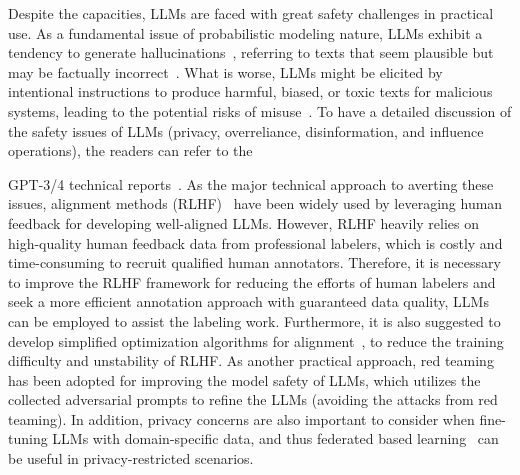 Despite the capacities, LLMs are faced with great safety challenges in practical use.
As a fundamental issue of probabilistic modeling nature, LLMs exhibit a tendency to generate hallucinations~\cite{Bang-arxiv-2023-A}, referring to texts that seem plausible but may be factually incorrect~\cite{OpenAI-OpenAI-2023-GPT-4}.  
What is worse, 
LLMs might be elicited by intentional instructions to produce harmful, biased, or toxic texts for malicious systems, leading to the potential risks of misuse~\cite{Brown-NeurIPS-2020-Language,Ouyang-arxiv-2022-Training}. 
To have a detailed  discussion of the safety issues of LLMs (\eg privacy, overreliance, disinformation, and influence operations), the readers can refer to the {GPT-3/4 technical reports~\cite{OpenAI-OpenAI-2023-GPT-4,Brown-NeurIPS-2020-Language}.  %
As the major technical approach to averting these issues, alignment methods (\eg RLHF)~\cite{Ouyang-arxiv-2022-Training,Glaese-arxiv-2022-Improving} have been widely used by leveraging human feedback for developing well-aligned LLMs.
However, RLHF heavily relies on high-quality human feedback data from professional labelers, which is costly and time-consuming to recruit qualified human annotators. %
Therefore, it is necessary to improve the RLHF framework for reducing the efforts of human labelers and seek a more efficient annotation approach with guaranteed data quality,  \eg LLMs can be employed to assist the labeling work. 
Furthermore, it is also suggested to develop simplified optimization algorithms for alignment~\cite{Rafailov-arxiv-2023-Direct,Guo-arxiv-2023-Beyond}, to reduce   the training difficulty and unstability of RLHF. 
As another practical approach, red teaming~\cite{Ganguli-arxiv-2022-Red,Perez-EMNLP-2022-Red} has been adopted for improving the model safety of LLMs, which utilizes the collected adversarial prompts to refine the LLMs (\ie  avoiding the attacks from red teaming). 
In addition, 
privacy  concerns are also important to consider when fine-tuning LLMs with domain-specific data, and thus federated based learning~\cite{Kuang-2023-arxiv-FederatedScope} can be useful in privacy-restricted scenarios.   

 



}
